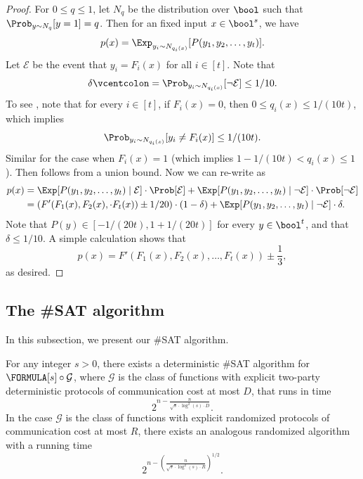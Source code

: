 \begin{proof}
	    For $0\leq q\leq 1$, let $N_q$ be the distribution over $\bool$ such that $\Prob_{y\sim N_q}[y=1]=q$. Then for an fixed input $x\in\bool^s$, we have
	    \begin{equation}\label{sat-bb1}
	        p(x)=\Exp_{y_i\sim N_{q_i(x)}}[P(y_1,y_2,\dots,y_t)].
	    \end{equation}
        Let $\mathcal{E}$ be the event that $y_i=F_i(x)$ for all $i\in[t]$. Note that
        \begin{equation}\label{sat-bb2}
            \delta \vcentcolon=\Prob_{y_i\sim N_{q_i(x)}}[\neg \mathcal{E}]\leq 1/10.
        \end{equation}
        To see , note that for every $i\in[t]$, if $F_i(x)=0$, then $0\leq q_i(x)\leq 1/(10t)$, which implies
        \[
            \Prob_{y_i\sim N_{q_i(x)}}[y_i\neq F_i(x)]\leq 1/(10t).
        \]
        Similar for the case when $F_i(x)=1$ (which implies $1-1/(10t)< q_i(x)\leq 1$). Then  follows from a union bound. Now we can re-write  as
        \begin{align*}
            p(x) &= \Exp[P(y_1,y_2,\dots,y_t)\mid \mathcal{E}]\cdot \Prob[\mathcal{E}] + \Exp[P(y_1,y_2,\dots,y_t)\mid \neg\mathcal{E}]\cdot \Prob[\neg\mathcal{E}]\\
            &=\left(F'(F_1(x),F_2(x),\cdot F_t(x))\pm 1/20 \right)\cdot(1-\delta)+ \Exp[P(y_1,y_2,\dots,y_t)\mid \neg\mathcal{E}]\cdot\delta.
        \end{align*}
        Note that $P(y)\in[-1/(20t),1+1/(20t)]$ for every $y\in\bool^t$, and that $\delta \leq 1/10$. A simple calculation shows that
        \[
               p(x) = F'(F_1(x),F_2(x),\dots, F_t(x))\pm \frac{1}{3},
        \]
        as desired.
	\end{proof}
    
%
    
%

%

%
%
%
%
%
%

	\subsection{The \#SAT algorithm}
	
	In this subsection, we present our \#SAT algorithm.
	
	\begin{theorem}\label{thm:sat-main}
	    For any integer $s>0$, there exists a deterministic \#SAT algorithm for $\FORMULA[s]\circ\mathcal{G}$, where $\mathcal{G}$ is the class of functions with explicit two-party deterministic protocols of communication cost at most $D$, that runs in time 
		\[
	        2^{n-\frac{n}{\sqrt{s}\cdot\log^2(s)\cdot D}}.
		\]
		In the case $\mathcal{G}$ is the class of functions with explicit randomized protocols of communication cost at most $R$, there exists an analogous randomized algorithm with a running time
		\[
	        2^{n-\left(\frac{n}{\sqrt{s}\cdot\log^2(s)\cdot R}\right)^{1/2}}.
	    \]
	\end{theorem}
	
